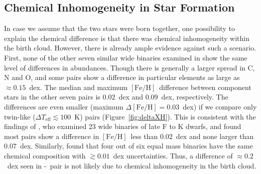 \documentclass[modern, letterpaper]{aastex61}
\newcommand{\figname}{Figure}
\newcommand*\elem[1]{\ensuremath{\mathrm{#1}}}
\newcommand*\elemH[1]{\ensuremath{[\mathrm{#1}/\elem{H}]}}
\newcommand*{\feh}{\ensuremath{\elemH{Fe}}}
\newcommand{\sunanalog}{\text{Krios}}
\newcommand{\bizarreone}{\text{Kronos}}
\begin{document}

\subsection{Chemical Inhomogeneity in Star Formation}
\label{sub:chemical_inhomogeneity_in_star_formation}

In case we assume that the two stars were born together, one possibility to
explain the chemical difference is that there was chemical inhomogeneity within
the birth cloud.
However, there is already ample evidence against such a scenario.
First, none of the other seven similar wide binaries examined in
\citealt{2016ApJS..225...32B} show the same level of differences in abundances.
Though there is generally a larger spread in $\elem{C}$, $\elem{N}$ and
$\elem{O}$, and some pairs show a difference in particular elements as large as
$\approx 0.15$~dex.
The median and maximum \feh\ difference between component stars in the other
seven pairs is $0.02$~dex and $0.09$~dex, respectively.
The differences are even smaller (maximum $\Delta\feh = 0.03$~dex) if we
compare only twin-like ($\Delta T_\mathrm{eff} \lesssim 100$~K) pairs
(\figname~\ref{fig:deltaXH}).
This is consistent with the findings of \citealt{Desidera:2004aa}, who examined
23 wide binaries of late F to K dwarfs, and found most pairs show a difference in
\feh\ less than $0.02$~dex and none larger than $0.07$~dex.
Similarly, \citealt{Gratton:2001aa} found that four out of six equal mass binaries
have the same chemical composition with $\gtrsim 0.01$~dex uncertainties.
Thus, a difference of $\approx 0.2$~dex seen in \bizarreone-\sunanalog\ pair is
not likely due to chemical inhomogeneity in the birth cloud.
\end{document}
